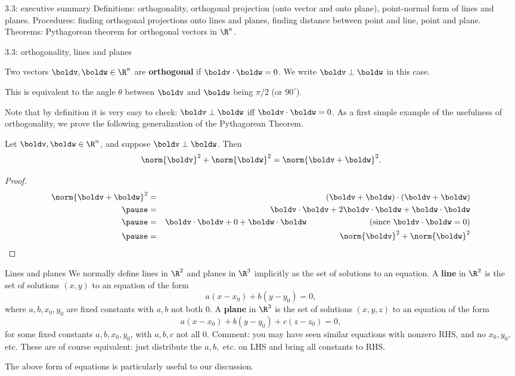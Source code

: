 \begin{frame}{3.3: executive summary}
\alert{Definitions:} orthogonality, orthogonal projection (onto vector and onto plane), point-normal form of lines and planes. 
\bspace
\alert{Procedures:} finding orthogonal projections onto lines and planes, finding distance between point and line, point and plane. 
\bspace
\alert{Theorems:} Pythagorean theorem for orthogonal vectors in $\R^n$. 
\end{frame}
\begin{frame}{3.3: orthogonality, lines and planes}
\footnotesize
\begin{definition}
Two vectors $\boldv,\boldw\in\R^n$ are {\bf orthogonal} if $\boldv\cdot\boldw=0$. We write $\boldv \perp \boldw$ in this case. 

This is equivalent to the angle $\theta$ between $\boldv$ and $\boldw$ being $\pi/2$ (or $90^\circ$). 
\end{definition}
\bpause 
Note that by definition it is very easy to check: $\boldv\perp\boldw$ iff $\boldv\cdot\boldw=0$. As a first simple example of the usefulness of orthogonality, we prove the following generalization of the Pythagorean Theorem. 
\begin{theorem}
Let $\boldv,\boldw\in\R^n$, and suppose  $\boldv\perp\boldw$. Then 
\[
\norm{\boldv}^2+\norm{\boldw}^2=\norm{\boldv+\boldw}^2.
\]
\end{theorem}
\pause
\begin{proof}
\begin{eqnarray*}
\norm{\boldv+\boldw}^2&=&(\boldv+\boldw)\cdot(\boldv+\boldw) \\
\pause&=&\boldv\cdot\boldv+2\boldv\cdot\boldw+\boldw\cdot\boldw \\
\pause&=&\boldv\cdot\boldv+0+\boldw\cdot\boldw  \ \hspace{1in} \text{(since $\boldv\cdot\boldw=0$)}\\
\pause&=&\norm{\boldv}^2+\norm{\boldw}^2
\end{eqnarray*}
\end{proof}
\end{frame}
\begin{frame}{Lines and planes}
We normally define lines in $\R^2$ and planes in $\R^3$ \alert{implicitly} as the set of solutions to an equation.
\bspace
A {\bf line} in $\R^2$ is the set of solutions $(x,y)$ to an equation of the form 
\[
a(x-x_0)+b(y-y_0)=0, \]
where $a, b, x_0, y_0$ are fixed constants with $a, b$ not both $0$.
\bspace
A {\bf plane} in $\R^3$ is the set of solutions $(x,y,z)$ to an equation of the form 
\[
a(x-x_0)+b(y-y_0)+c(z-z_0)=0,\]
for some fixed constants $a,b,x_0,y_0$, with $a, b, c$ not all $0$.
\bpause
\alert{Comment:} you may have seen similar equations with nonzero RHS, and no $x_0,y_0,$ etc. These are of course equivalent: just distribute the $a,b,$ etc. on LHS and bring all constants to RHS. 

The above form of equations is particularly useful to our discussion.
\end{frame}
